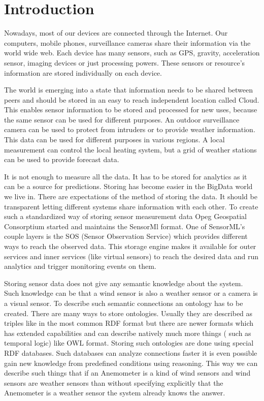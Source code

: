 \chapter*{Introduction}

Nowadays, most of our devices are connected through the Internet. Our computers, mobile phones, surveillance cameras share their information via the world wide web. Each device has many sensors, such as GPS, gravity, acceleration sensor, imaging devices or just processing powers. These sensors or resource's information are stored individually on each device. 

The world is emerging into a state that information needs to be shared between peers and should be stored in an easy to reach independent location called Cloud. 
This enables sensor information to be stored and processed for new uses, because the same sensor can be used for different purposes. An outdoor surveillance camera can be used to protect from intruders or to provide weather information. This data can be used for different purposes in various regions. A local measurement can control the local heating system, but a grid of weather stations can be used to provide forecast data.
 
 It is not enough to measure all the data. It has to be stored for analytics as it can be a source for predictions. Storing has become easier in the BigData world we live in. There are expectations of the method of storing the data. It should be transparent letting different systems share information with each other. To create such a standardized way of storing sensor measurement data Opeg Geospatial Consorptium started and maintains the SensorMl format. One of SensorML's couple layers is the SOS (Sensor Observation Service) which provides different ways to reach the observed data. This storage engine makes it available for outer services and inner services (like virtual sensors) to reach the desired data and run analytics and trigger monitoring events on them.

Storing sensor data does not give any semantic knowledge about the system. Such knowledge can be that a wind sensor is also a weather sensor or a camera is a visual sensor. To describe such semantic connections an ontology has to be created. There are many ways to store ontologies. Usually they are described as triples like in the most common RDF format but there are newer formats which has extended capabilities and can describe natively much more things ( such as temporal logic) like OWL format. Storing such ontologies are done using special RDF databases. Such databases can analyze connections faster it is even possible gain new knowledge from predefined conditions using reasoning. This way we can describe such things that if an Anemometer is a kind of wind sensors and wind sensors are weather sensors than without specifying explicitly that the Anemometer is a weather sensor the system already knows the answer. 

